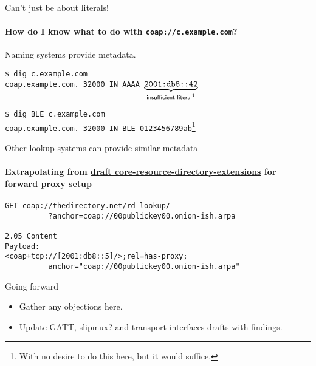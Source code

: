 \documentclass[aspectratio=169,colorlinks]{beamer}
\newcommand{\ietfdraft}[1]{\href{https://datatracker.ietf.org/doc/draft-#1/}{draft #1}}
\begin{document}
\begin{frame}{Can't just be about literals!}\large
  \framesubtitle{How do I know what to do with \texttt{coap://c.example.com}?}

  Naming systems provide metadata.

  \bigskip

  \texttt{{\color{gray}\$} dig c.example.com}\\
  \texttt{coap.example.com. 32000 IN AAAA $\underbrace{\texttt{2001:db8::42}}_{\textsf{insufficient literal\footnotemark[1]}}$}

  \texttt{{\color{gray}\$} dig BLE c.example.com}\\
  \texttt{coap.example.com. 32000 IN BLE 0123456789ab}\footnote[2]{With no desire to do this here, but it would suffice.}
\end{frame}

\begin{frame}[fragile]{Other lookup systems can provide similar metadata}\large
  \framesubtitle{Extrapolating from \ietfdraft{core-resource-directory-extensions} for forward proxy setup}

\begin{verbatim}
GET coap://thedirectory.net/rd-lookup/
          ?anchor=coap://00publickey00.onion-ish.arpa

2.05 Content
Payload:
<coap+tcp://[2001:db8::5]/>;rel=has-proxy;
          anchor="coap://00publickey00.onion-ish.arpa"
\end{verbatim}
\end{frame}

\begin{frame}{Going forward}\Large
  \begin{itemize}
    \item Gather any objections here.
    \item Update GATT, slipmux? and transport-interfaces drafts with findings.
  \end{itemize}
\end{frame}
\end{document}
